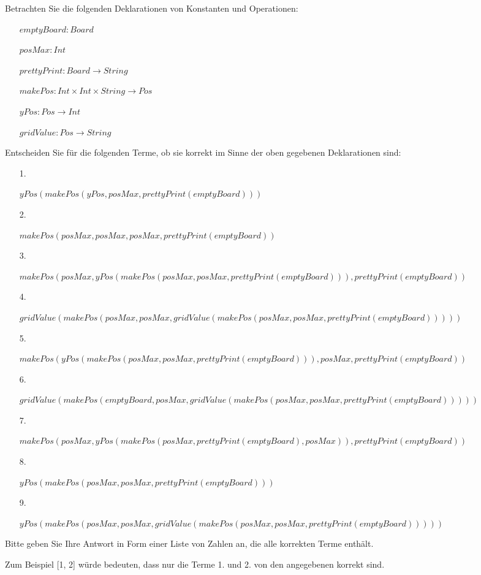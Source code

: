 Betrachten Sie die folgenden Deklarationen von Konstanten und Operationen:

\begin{itemize}
\item[] \parbox[t]{\linewidth}{$\mathit{emptyBoard} : \mathit{Board}$}
\item[] \parbox[t]{\linewidth}{$\mathit{posMax} : \mathit{Int}$}
\item[] \parbox[t]{\linewidth}{$\mathit{prettyPrint} : \mathit{Board} \to \mathit{String}$}
\item[] \parbox[t]{\linewidth}{$\mathit{makePos} : \mathit{Int} \times \mathit{Int} \times \mathit{String} \to \mathit{Pos}$}
\item[] \parbox[t]{\linewidth}{$\mathit{yPos} : \mathit{Pos} \to \mathit{Int}$}
\item[] \parbox[t]{\linewidth}{$\mathit{gridValue} : \mathit{Pos} \to \mathit{String}$}\end{itemize}Entscheiden Sie für die folgenden Terme, ob sie korrekt im Sinne der oben gegebenen Deklarationen sind:

\begin{itemize}
\item[1.]\parbox[t]{\linewidth}{$yPos(makePos(yPos,posMax,prettyPrint(emptyBoard)))$}
\item[2.]\parbox[t]{\linewidth}{$makePos(posMax,posMax,posMax,prettyPrint(emptyBoard))$}
\item[3.]\parbox[t]{\linewidth}{$makePos(posMax,yPos(makePos(posMax,posMax,prettyPrint(emptyBoard))),prettyPrint(emptyBoard))$}
\item[4.]\parbox[t]{\linewidth}{$gridValue(makePos(posMax,posMax,gridValue(makePos(posMax,posMax,prettyPrint(emptyBoard)))))$}
\item[5.]\parbox[t]{\linewidth}{$makePos(yPos(makePos(posMax,posMax,prettyPrint(emptyBoard))),posMax,prettyPrint(emptyBoard))$}
\item[6.]\parbox[t]{\linewidth}{$gridValue(makePos(emptyBoard,posMax,gridValue(makePos(posMax,posMax,prettyPrint(emptyBoard)))))$}
\item[7.]\parbox[t]{\linewidth}{$makePos(posMax,yPos(makePos(posMax,prettyPrint(emptyBoard),posMax)),prettyPrint(emptyBoard))$}
\item[8.]\parbox[t]{\linewidth}{$yPos(makePos(posMax,posMax,prettyPrint(emptyBoard)))$}
\item[9.]\parbox[t]{\linewidth}{$yPos(makePos(posMax,posMax,gridValue(makePos(posMax,posMax,prettyPrint(emptyBoard)))))$}\end{itemize}Bitte geben Sie Ihre Antwort in Form einer Liste von Zahlen an, die alle korrekten Terme enthält.

Zum Beispiel [1, 2] würde bedeuten, dass nur die Terme 1. und 2. von den angegebenen korrekt sind.

